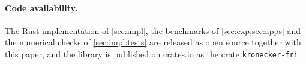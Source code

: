 \paragraph{Code availability.}
The Rust implementation of \cref{sec:impl}, the benchmarks of \cref{sec:exp,sec:apps} and the numerical checks of \cref{sec:impl:tests} are released as open source together with this paper, and the library is published on crates.io as the crate \texttt{kronecker-fri}.
